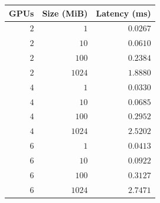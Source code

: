 \begin{tabular}{rrr}
\toprule
GPUs & Size (MiB) & Latency (ms) \\
\midrule
$2$ & $1$ & $0.0267$ \\
$2$ & $10$ & $0.0610$ \\
$2$ & $100$ & $0.2384$ \\
$2$ & $1024$ & $1.8880$ \\
$4$ & $1$ & $0.0330$ \\
$4$ & $10$ & $0.0685$ \\
$4$ & $100$ & $0.2952$ \\
$4$ & $1024$ & $2.5202$ \\
$6$ & $1$ & $0.0413$ \\
$6$ & $10$ & $0.0922$ \\
$6$ & $100$ & $0.3127$ \\
$6$ & $1024$ & $2.7471$ \\
\bottomrule
\end{tabular}
